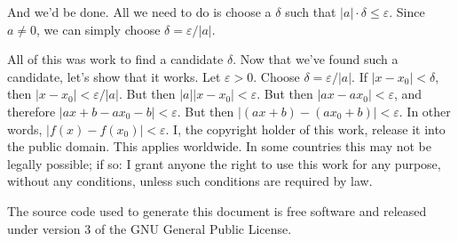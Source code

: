 \documentclass{article}
\theoremstyle{normal}
\begin{document}
    And we'd be done. All we need to do is choose a $\delta$ such that
    $|a|\cdot\delta\leq\varepsilon$. Since $a\ne{0}$, we can simply choose
    $\delta=\varepsilon/|a|$.
    \par\hfill\par
    All of this was work to find a candidate $\delta$. Now that we've found
    such a candidate, let's show that it works. Let $\varepsilon>0$. Choose
    $\delta=\varepsilon/|a|$. If $|x-x_{0}|<\delta$, then
    $|x-x_{0}|<\varepsilon/|a|$. But then $|a||x-x_{0}|<\varepsilon$. But then
    $|ax-ax_{0}|<\varepsilon$, and therefore
    $|ax+b-ax_{0}-b|<\varepsilon$. But then
    $|(ax+b)-(ax_{0}+b)|<\varepsilon$. In other words,
    $|f(x)-f(x_{0})|<\varepsilon$.
    \newpage
    I, the copyright holder of this work, release it into the public domain.
    This applies worldwide. In some countries this may not be legally possible;
    if so: I grant anyone the right to use this work for any purpose, without
    any conditions, unless such conditions are required by law.
    \par\hfill\par
    The source code used to generate this document is free software and released
    under version 3 of the GNU General Public License.
\end{document}

